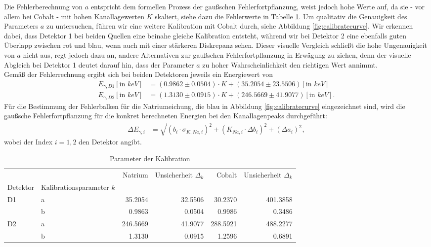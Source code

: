 \documentclass[%
aps,
onecolumn,
11pt,
tightenlines,
nofootinbib,
superscriptaddress,
floatfix,
prd,
]{revtex4-2}
\begin{document}
Die Fehlerberechnung von $a$ entspricht dem formellen Prozess der gaußschen Fehlerfortpflanzung, weist jedoch hohe Werte auf, da sie - vor allem bei Cobalt - mit hohen Kanallagewerten $K$ skaliert, siehe dazu die Fehlerwerte in Tabelle \ref{tab:calibration}. Um qualitativ die Genauigkeit des Parameters $a$ zu untersuchen, führen wir eine weitere Kalibration mit Cobalt durch, siehe Abbildung \ref{fig:calibratecurve}. Wir erkennen dabei, dass Detektor 1 bei beiden Quellen eine beinahe gleiche Kalibration entsteht, während wir bei Detektor 2 eine ebenfalls guten Überlapp zwischen rot und blau, wenn auch mit einer stärkeren Diskrepanz sehen. Dieser visuelle Vergleich schließt die hohe Ungenauigkeit von $a$ nicht aus, regt jedoch dazu an, andere Alternativen zur gaußschen Fehlerfortpflanzung in Erwägung zu ziehen, denn der visuelle Abgleich bei Detektor 1 deutet darauf hin, dass der Parameter $a$ zu hoher Wahrscheinlichkeit den richtigen Wert annimmt. \\
Gemäß der Fehlerrechnung ergibt sich bei beiden Detektoren jeweils ein Energiewert von
\begin{align}
	E_{\gamma, D1} [\text{in $keV$}]&= (0.9862 \pm 0.0504)\cdot K + (35.2054 \pm 23.5506) [\text{in $keV$}]\\
	E_{\gamma, D2} [\text{in $keV$}]&= (1.3130 \pm 0.0915)\cdot K + (246.5669 \pm 41.9077) [\text{in $keV$}].
\end{align}
Für die Bestimmung der Fehlerbalken für die Natriumeichung, die blau in Abbildung \ref{fig:calibratecurve} eingezeichnet sind, wird die gaußsche Fehlerfortpflanzung für die konkret berechneten Energien bei den Kanallagenpeaks durchgeführt:
\begin{align}
	\Delta E_{\gamma,i} &= \sqrt{(b_i \cdot \sigma_{K,Na,i})^2 + (K_{Na,i} \cdot \Delta b_i)^2 + (\Delta a_i)^2},
\end{align}
wobei der Index $i = 1,2$ den Detektor angibt.

\begin{table}[H]
	\centering
	\begin{tabular}{ll|rr|rr}
	\toprule
	 &  & Natrium & Unsicherheit $\Delta_k$ & Cobalt & Unsicherheit $\Delta_k$ \\
	Detektor & Kalibrationsparameter $k$ &  &  &  &  \\
	\midrule
	\multirow[t]{2}{*}{D1} & a & 35.2054 & 32.5506 & 30.2370 & 401.3858 \\
	 & b & 0.9863 & 0.0504 & 0.9986 & 0.3486 \\
	\cline{1-6}
	\multirow[t]{2}{*}{D2} & a & 246.5669 & 41.9077 & 288.5921 & 488.2277 \\
	 & b & 1.3130 & 0.0915 & 1.2596 & 0.6891 \\
	\cline{1-6}
	\bottomrule
	\end{tabular}
\caption{Parameter der Kalibration}
\label{tab:calibration}
\end{table}
\end{document}
